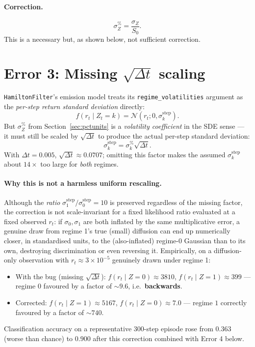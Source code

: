 \documentclass[11pt]{article}
\newcommand{\N}{\mathcal{N}}
\begin{document}
\paragraph{Correction.}
\begin{equation}
\sigma^{\%}_{Z} = \frac{\sigma_Z}{S_0}.
\end{equation}
This is a necessary but, as shown below, not sufficient correction.

\section{Error 3: Missing $\sqrt{\Delta t}$ scaling}
\label{sec:dtscale}

\texttt{HamiltonFilter}'s emission model treats its \texttt{regime\_volatilities} argument as the \emph{per-step return standard deviation} directly:
\begin{equation}
f(r_t \mid Z_t = k) = \N(r_t; 0, \sigma_k^{\text{step}}).
\end{equation}
But $\sigma^{\%}_Z$ from Section~\ref{sec:pctunits} is a \emph{volatility coefficient} in the SDE sense — it must still be scaled by $\sqrt{\Delta t}$ to produce the actual per-step standard deviation:
\begin{equation}
\sigma_k^{\text{step}} = \sigma^{\%}_k \sqrt{\Delta t}.
\end{equation}
With $\Delta t = 0.005$, $\sqrt{\Delta t} \approx 0.0707$; omitting this factor makes the assumed $\sigma_k^{\text{step}}$ about $14\times$ too large for \emph{both} regimes.

\paragraph{Why this is not a harmless uniform rescaling.} Although the \emph{ratio} $\sigma_1^{\text{step}}/\sigma_0^{\text{step}} = 10$ is preserved regardless of the missing factor, the correction is not scale-invariant for a fixed likelihood ratio evaluated at a fixed observed $r_t$: if $\sigma_0, \sigma_1$ are both inflated by the same multiplicative error, a genuine draw from regime 1's true (small) diffusion can end up numerically closer, in standardised units, to the (also-inflated) regime-0 Gaussian than to its own, destroying discrimination or even reversing it. Empirically, on a diffusion-only observation with $r_t \approx 3\times 10^{-5}$ genuinely drawn under regime 1:
\begin{itemize}
\item With the bug (missing $\sqrt{\Delta t}$): $f(r_t\mid Z{=}0) \approx 3810$, $f(r_t\mid Z{=}1) \approx 399$ — regime $0$ favoured by a factor of $\sim 9.6$, i.e.\ \textbf{backwards}.
\item Corrected: $f(r_t\mid Z{=}1) \approx 5167$, $f(r_t\mid Z{=}0)\approx 7.0$ — regime $1$ correctly favoured by a factor of $\sim 740$.
\end{itemize}
Classification accuracy on a representative 300-step episode rose from $0.363$ (worse than chance) to $0.900$ after this correction combined with Error 4 below.
\end{document}
